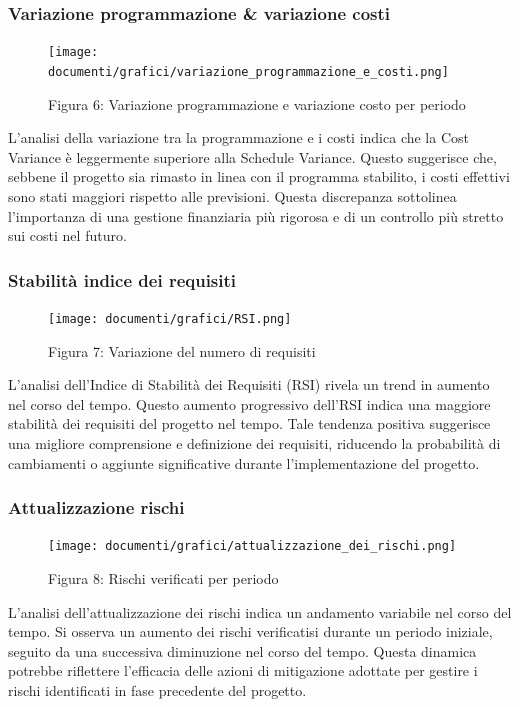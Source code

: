 \documentclass{article}
\begin{document}
\subsubsection{Variazione programmazione \& variazione costi}
\begin{figure}[H]
    \centering
    \texttt{[image: documenti/grafici/variazione\_programmazione\_e\_costi.png]}
    \caption{Figura 6: Variazione programmazione e variazione costo per periodo}
    \end{figure}
    L'analisi della variazione tra la programmazione e i costi indica che la Cost Variance è leggermente superiore alla Schedule Variance. Questo suggerisce che, sebbene il progetto sia rimasto in linea con il programma stabilito, i costi effettivi sono stati maggiori rispetto alle previsioni. Questa discrepanza sottolinea l'importanza di una gestione finanziaria più rigorosa e di un controllo più stretto sui costi nel futuro.
\subsubsection{Stabilità indice dei requisiti}
\begin{figure}[H]
    \centering
    \texttt{[image: documenti/grafici/RSI.png]}
    \caption{Figura 7: Variazione del numero di requisiti}
    \end{figure}
    L'analisi dell'Indice di Stabilità dei Requisiti (RSI) rivela un trend in aumento nel corso del tempo. Questo aumento progressivo dell'RSI indica una maggiore stabilità dei requisiti del progetto nel tempo. Tale tendenza positiva suggerisce una migliore comprensione e definizione dei requisiti, riducendo la probabilità di cambiamenti o aggiunte significative durante l'implementazione del progetto.
\subsubsection{Attualizzazione rischi}
\begin{figure}[H]
    \centering
    \texttt{[image: documenti/grafici/attualizzazione\_dei\_rischi.png]}
    \caption{Figura 8: Rischi verificati per periodo}
    \end{figure}
    L'analisi dell'attualizzazione dei rischi indica un andamento variabile nel corso del tempo. Si osserva un aumento dei rischi verificatisi durante un periodo iniziale, seguito da una successiva diminuzione nel corso del tempo. Questa dinamica potrebbe riflettere l'efficacia delle azioni di mitigazione adottate per gestire i rischi identificati in fase precedente del progetto.
\end{document}
